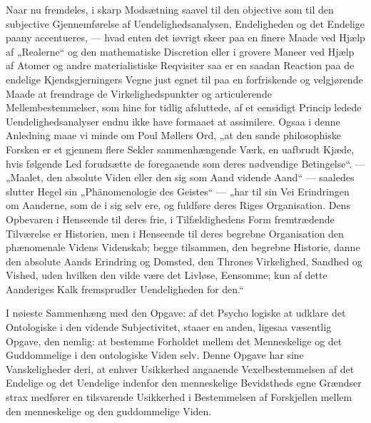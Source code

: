 \documentclass[12pt]{book}
\newcommand{\opage}[1]{\marginnote{\footnotesize\textit{[#1]}}}
\begin{document}
Naar nu fremdeles, i skarp Modsætning saavel til den objective som til den subjective
Gjennemførelse af Uendelighedsanalysen, Endeligheden og det Endelige paany accentueres, --- hvad
enten det iøvrigt skeer paa en finere Maade ved Hjælp af „Realerne“ og den mathematiske Discretion
eller i grovere Maneer ved Hjælp af Atomer og andre materialistiske Reqvisiter saa er en saadan
Reaction paa de endelige Kjendsgjerningers Vegne just egnet til paa en forfriskende og velgjørende
Maade at fremdrage de Virkelighedspunkter og articulerende Mellembestemmelser, som hine for tidlig
afsluttede, af et eensidigt Princip ledede Uendelighedsanalyser endnu ikke have formaaet at
assimilere. Ogsaa i denne Anledning maae vi minde om Poul Møllers Ord, „at den sande philosophiske
Forsken er et gjennem flere Sekler sammenhængende Værk, en uafbrudt Kjæde, hvis følgende Led
forudsætte de foregaaende som deres nødvendige Betingelse“. --- „Maalet, den absolute Viden eller
den sig som Aand vidende Aand“ --- saaledes slutter Hegel sin „Phänomenologie des Geistes“ ---
„har til sin Vei Erindringen om Aanderne, som de i sig selv ere, og fuldføre deres Riges
Organisation. Dens Opbevaren i Henseende til deres frie, i Tilfældighedens Form fremtrædende
Tilværelse er Historien, men i Henseende til deres begrebne Organisation den phænomenale Videns
Videnskab; begge tilsammen, den begrebne Historie, danne den absolute Aands Erindring og Domsted,
den Thrones Virkelighed, Sandhed og Vished, uden hvilken den vilde være det Livløse, Eensomme; kun
af dette Aanderiges Kalk fremsprudler Uendeligheden for den.“

I nøieste Sammenhæng med den Opgave: af det Psycho%
\opage{233} logiske at udklare det Ontologiske i den vidende Subjectivitet, staaer en anden, ligesaa væsentlig
Opgave, den nemlig: at bestemme Forholdet mellem det Menneskelige og det Guddommelige i den
ontologiske Viden selv. Denne Opgave har sine Vanskeligheder deri, at enhver Usikkerhed angaaende
Vexelbestemmelsen af det Endelige og det Uendelige indenfor den menneskelige Bevidstheds egne
Grændser strax medfører en tilsvarende Usikkerhed i Bestemmelsen af Forskjellen mellem den
menneskelige og den guddommelige Viden.
\end{document}
